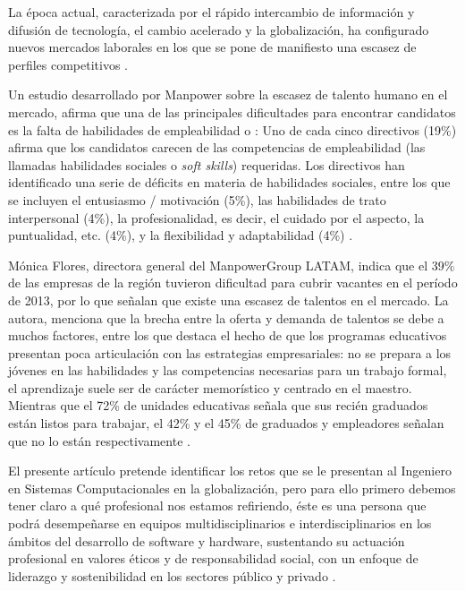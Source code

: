 
La época actual, caracterizada por el rápido intercambio de información y difusión de tecnología, el cambio acelerado y la globalización, ha configurado nuevos mercados laborales en los que se pone de manifiesto una escasez de perfiles competitivos \cite{innova:2016,vart:2000}. 
\vspace{5mm}

\noindent Un estudio desarrollado por Manpower sobre la escasez de talento humano en el mercado, afirma que una de las principales dificultades para encontrar candidatos es la falta de habilidades de empleabilidad o : Uno de cada cinco directivos (19\%) afirma que los candidatos carecen de las competencias de empleabilidad (las llamadas habilidades sociales o \textit{soft skills}) requeridas. Los directivos han identificado una serie de déficits en materia de habilidades sociales, entre los que se incluyen el entusiasmo / motivación (5\%), las habilidades de trato interpersonal (4\%), la profesionalidad, es decir, el cuidado por el aspecto, la puntualidad, etc. (4\%), y la
flexibilidad y adaptabilidad (4\%) \cite{mpst:2015}.
\vspace{5mm}

\noindent Mónica Flores, directora general del ManpowerGroup LATAM, indica que el 39\% de las empresas de la región tuvieron dificultad para cubrir vacantes en el período de 2013, por lo que señalan que existe una escasez de talentos en el mercado. La autora, menciona que la brecha entre la oferta y demanda de talentos se debe a muchos factores, entre los que destaca el hecho de que los programas educativos presentan poca articulación con las estrategias empresariales: no se prepara a los jóvenes en las habilidades y las competencias necesarias para un trabajo formal, el aprendizaje suele ser de carácter memorístico y centrado en el maestro. Mientras que el 72\% de unidades educativas señala que sus recién graduados están listos para trabajar, el 42\% y el 45\% de graduados y empleadores señalan que no lo están respectivamente \cite{flores:2014}.
\vspace{5mm}

\noindent El presente artículo pretende identificar los retos que se le presentan al Ingeniero en Sistemas Computacionales en la globalización, pero para ello primero debemos tener claro a qué profesional nos estamos refiriendo, éste es una persona que podrá desempeñarse en equipos multidisciplinarios e interdisciplinarios en los ámbitos del desarrollo de software y hardware, sustentando su actuación profesional en valores éticos y de responsabilidad social, con un enfoque de liderazgo y sostenibilidad en los sectores público y privado \cite{escom:perfil}. 
\vspace{5mm}

